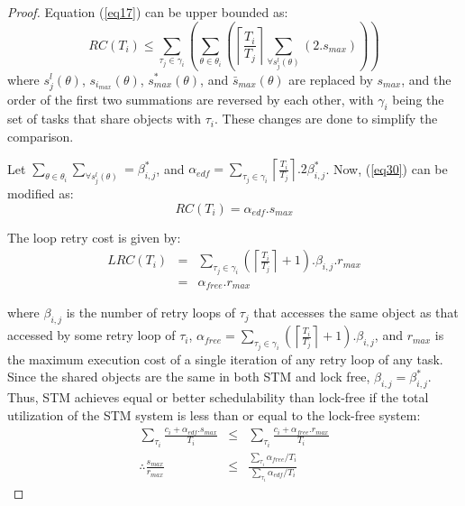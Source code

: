 \documentclass{sig-alternate}
\begin{document}
\begin{proof}
Equation (\ref{eq17}) can be upper bounded as:
\begin{equation}
RC\left(T_{i}\right) \le \sum_{\tau_{j}\in\gamma_{i}}\left(\sum_{\theta\in\theta_{i}}\left(\left\lceil\frac{T_{i}}{T_{j}}\right\rceil\sum_{\forall s_{j}^{l}\left(\theta\right)}\left(2.s_{max}\right)\right)\right)
\label{eq30}
\end{equation}
where $s_{j}^{l}\left(\theta\right)$, $s_{i_{max}}\left(\theta\right)$,
$s_{max}^{*}\left(\theta\right)$, and $\bar{s}_{max}\left(\theta\right)$ are replaced by $s_{max}$, and the order of the first two summations are reversed
by each other, 
with $\gamma_{i}$ being the set of tasks that share objects
with $\tau_{i}$. These changes are done to simplify the comparison.

Let $\sum_{\theta\in\theta_{i}}\sum_{\forall s_{j}^{l}\left(\theta\right)}=\beta_{i,j}^{*}$, and $\alpha_{edf}=\sum_{\tau_{j}\in\gamma_{i}}\left\lceil\frac{T_{i}}{T_{j}}\right\rceil.2\beta_{i,j}^*$. Now, (\ref{eq30}) can be modified as:
\begin{equation}
RC\left(T_{i}\right)=\alpha_{edf}.s_{max}
\label{eq31}
\end{equation}

The loop retry cost is given by:
\begin{eqnarray}
LRC\left(T_i\right)&=&\sum_{\tau_{j}\in\gamma_{i}}\left(\left\lceil\frac{T_{i}}{T_{j}}\right\rceil+1\right).\beta_{i,j}.r_{max}\nonumber \\
&=& \alpha_{free} . r_{max} \label{eq32}
\end{eqnarray}

where $\beta_{i,j}$ is the number of retry loops of $\tau_{j}$ that accesses the same object as that accessed by some retry loop of $\tau_{i}$, $\alpha_{free} = \sum_{\tau_{j}\in\gamma_{i}}\left(\left\lceil\frac{T_{i}}{T_{j}}\right\rceil + 1 \right).\beta_{i,j}$, and $r_{max}$ is the maximum execution cost of a single iteration of any retry loop of any task.
Since the shared objects are the same in both STM and lock free, $\beta_{i,j}=\beta_{i,j}^{*}$.
Thus, STM achieves equal or better schedulability 
than lock-free if the total utilization of the STM system is less than or equal to the lock-free system:
\begin{eqnarray}
\sum_{\tau_{i}}\frac{c_{i}+\alpha_{edf}.s_{max}} {T_{i}} & \le & \sum_{\tau_{i}}\frac{c_{i}+\alpha_{free}.r_{max}}{T_{i}} \nonumber \\
\therefore\frac{s_{max}}{r_{max}} & \le & \frac{\sum_{\tau_{i}}\alpha_{free}/T_{i}}{\sum_{\tau_{i}}\alpha_{edf}/T_{i}}\end{eqnarray}



\end{proof}
\end{document}
